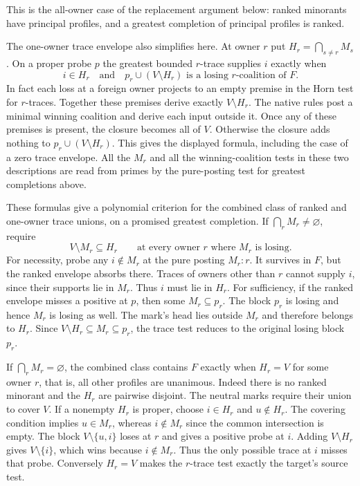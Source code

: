 This is the all-owner case of the replacement argument below:
ranked minorants have principal profiles, and a greatest
completion of principal profiles is ranked.

The one-owner trace envelope also simplifies here. At owner $r$
put $H_r=\bigcap_{s\ne r}M_s$. On a proper probe $p$ the
greatest bounded $r$-trace supplies $i$ exactly when
\[
 i\in H_r
 \quad\text{and}\quad
 p_r\cup(V\setminus H_r)\text{ is a losing $r$-coalition of }F.
\]
In fact each loss at a foreign owner projects to an empty premise
in the Horn test for $r$-traces. Together these premises derive
exactly $V\setminus H_r$. The native rules post a minimal
winning coalition and derive each input outside it. Once any of
these premises is present, the closure becomes all of $V$.
Otherwise the closure adds nothing to $p_r\cup(V\setminus H_r)$.
This gives the displayed formula, including the case of a zero
trace envelope. All the $M_r$ and all the winning-coalition tests
in these two descriptions are read from primes by the pure-posting
test for greatest completions above.

These formulas give a polynomial criterion for the combined
class of ranked and one-owner trace unions, on a promised
greatest completion. If $\bigcap_r M_r\ne\varnothing$, require
\[
 V\setminus M_r\subseteq H_r
 \qquad\text{at every owner $r$ where $M_r$ is losing}.
\]
For necessity, probe any $i\notin M_r$ at the pure posting
$M_r:r$. It survives in $F$, but the ranked envelope absorbs
there. Traces of owners other than $r$ cannot supply $i$, since
their supports lie in $M_r$. Thus $i$ must lie in $H_r$.
For sufficiency, if the ranked envelope misses a positive at
$p$, then some $M_r\subseteq p_r$. The block $p_r$ is losing
and hence $M_r$ is losing as well. The mark's head lies outside
$M_r$ and therefore belongs to $H_r$. Since
$V\setminus H_r\subseteq M_r\subseteq p_r$, the trace test
reduces to the original losing block $p_r$.

If $\bigcap_r M_r=\varnothing$, the combined class contains
$F$ exactly when $H_r=V$ for some owner $r$, that is, all
other profiles are unanimous. Indeed there is no ranked
minorant and the $H_r$ are pairwise disjoint. The neutral
marks require their union to cover $V$. If a nonempty $H_r$
is proper, choose $i\in H_r$ and $u\notin H_r$.
The covering condition implies $u\in M_r$, whereas
$i\notin M_r$ since the common intersection is empty.
The block $V\setminus\{u,i\}$ loses at $r$ and gives a
positive probe at $i$. Adding $V\setminus H_r$ gives
$V\setminus\{i\}$, which wins because $i\notin M_r$.
Thus the only possible trace at $i$ misses that probe.
Conversely $H_r=V$ makes the $r$-trace test exactly the
target's source test.

